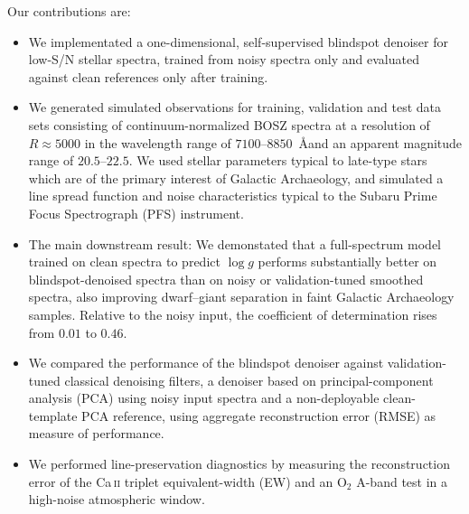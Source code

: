 \documentclass[twocolumn]{aastex7}
\begin{document}
Our contributions are:
\begin{itemize}
    \item We implementated a one-dimensional, self-supervised blindspot denoiser for low-S/N stellar spectra, trained from noisy spectra only and evaluated against clean references only after training.
    \item We generated simulated observations for training, validation and test data sets consisting of continuum-normalized BOSZ \citep{Bohlin2017} spectra at a resolution of $R\!\approx\!5000$ in the wavelength range of $7100$--$8850$~\AA and an apparent magnitude range of $20.5$--$22.5$. We used stellar parameters typical to late-type stars which are of the primary interest of Galactic Archaeology, and simulated a line spread function and noise characteristics typical to the Subaru Prime Focus Spectrograph (PFS) instrument.
    \item The main downstream result: We demonstated that a full-spectrum model trained on clean spectra to predict $\log g$ performs substantially better on blindspot-denoised spectra than on noisy or validation-tuned smoothed spectra, also improving dwarf--giant separation in faint Galactic Archaeology samples. Relative to the noisy input, the coefficient of determination rises from $0.01$ to $0.46$.
    \item We compared the performance of the blindspot denoiser against validation-tuned classical denoising filters, a denoiser based on principal-component analysis (PCA) using noisy input spectra and a non-deployable clean-template PCA reference, using aggregate reconstruction error (RMSE) as measure of performance.
    \item We performed line-preservation diagnostics by measuring the reconstruction error of the Ca\,\textsc{ii} triplet equivalent-width (EW) and an \mbox{O$_2$} A-band test in a high-noise atmospheric window.
\end{itemize}
\end{document}
